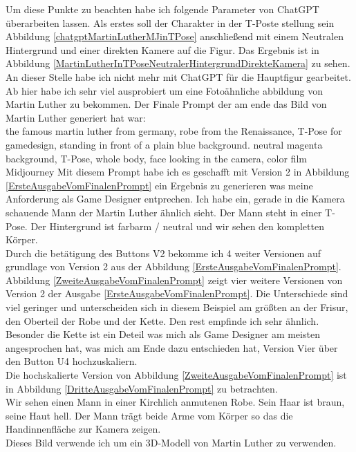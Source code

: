 \documentclass[10pt,a4paper,bibliography=totocnumbered,listof=totocnumbered]{scrartcl}
\begin{document}
Um diese Punkte zu beachten habe ich folgende Parameter von ChatGPT überarbeiten lassen. Als erstes soll der Charakter in der T-Poste stellung sein Abbildung \ref{chatgptMartinLutherMJinTPose} anschließend mit einem Neutralen Hintergrund und einer direkten Kamere auf die Figur. Das Ergebnis ist in Abbildung \ref{MartinLutherInTPoseNeutralerHintergrundDirekteKamera} zu sehen.
\\
An dieser Stelle habe ich nicht mehr mit ChatGPT für die Hauptfigur gearbeitet. Ab hier habe ich sehr viel ausprobiert um eine Fotoähnliche abbildung von Martin Luther zu bekommen. Der Finale Prompt der am ende das Bild von Martin Luther generiert hat war:
\\
the famous martin luther from germany, robe from the Renaissance, T-Pose for gamedesign, standing in front of a plain blue background. neutral magenta background, T-Pose, whole body, face looking in the camera, color film
\\
Midjourney
Mit diesem Prompt habe ich es geschafft mit Version 2 in Abbildung \ref{ErsteAusgabeVomFinalenPrompt} ein Ergebnis zu generieren was meine Anforderung als Game Designer entprechen. Ich habe ein, gerade in die Kamera schauende Mann der Martin Luther ähnlich sieht. Der Mann steht in einer T-Pose. Der Hintergrund ist farbarm / neutral und wir sehen den kompletten Körper.
\\
Durch die betätigung des Buttons V2 bekomme ich 4 weiter Versionen auf grundlage von Version 2 aus der Abbildung \ref{ErsteAusgabeVomFinalenPrompt}.
\\
Abbildung \ref{ZweiteAusgabeVomFinalenPrompt} zeigt vier weitere Versionen von Version 2 der Ausgabe \ref{ErsteAusgabeVomFinalenPrompt}. Die Unterschiede sind viel geringer und unterscheiden sich in diesem Beispiel am größten an der Frisur, den Oberteil der Robe und der Kette. Den rest empfinde ich sehr ähnlich.
\\
Besonder die Kette ist ein Deteil was mich als Game Designer am meisten angesprochen hat, was mich am Ende dazu entschieden hat, Version Vier über den Button U4 hochzuskaliern.
\\
Die hochskalierte Version von Abbildung \ref{ZweiteAusgabeVomFinalenPrompt} ist in Abbildung \ref{DritteAusgabeVomFinalenPrompt} zu betrachten.
\\
Wir sehen einen Mann in einer Kirchlich anmutenen Robe. Sein Haar ist braun, seine Haut hell. Der Mann trägt beide Arme vom Körper so das die Handinnenfläche zur Kamera zeigen.
\\
Dieses Bild verwende ich um ein 3D-Modell von Martin Luther zu verwenden.
\end{document}
